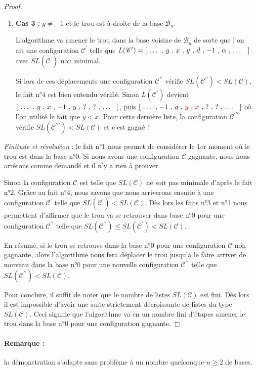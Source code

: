 \begin{proof}
\begin{enumerate}
        \item \textbf{Cas 3 :} $g \neq -1$ et le trou est à droite de la base $\mathcal{B}_y$.

        L'algorithme va amener le trou dans la base voisine de $\mathcal{B}_y$ de sorte que l'on ait une configuration $\mathscr{C}^\prime$ telle que $L(\mathscr{C}^\prime) = [ \text{\ \dots{} , $g$ , $x$ , $y$ , $d$ , $-1$ , $\alpha$ , \dots{} \ } ]$ avec $SL(\mathscr{C}^\prime)$ non minimal.

        Si lors de ces déplacements une configuration $\mathscr{C}^{\prime\prime}$ vérifie $SL(\mathscr{C}^{\prime\prime}) < SL(\mathscr{C})$, le fait n°4 est bien entendu vérifié.
        Sinon $L(\mathscr{C}^\prime)$ devient $[ \text{\ \dots{} , $g$ , $x$ , $-1$ , $y$ , $?$ , $?$ , \dots{} \ } ]$, puis $[ \text{\ \dots{} , $-1$ , $g$ , {\color{red} $y$ , $x$} , $?$ , $?$ , \dots{} \ } ]$ où l'on utilisé le fait que $y < x$. Pour cette dernière liste, la configuration $\mathscr{C}^{\prime\prime\prime}$ vérifie $SL(\mathscr{C}^{\prime\prime\prime}) < SL(\mathscr{C})$ et c'est gagné !
    \end{enumerate}


    \medskip

    \textit{Finitude et résolution} : le fait n°1 nous permet de considérer le 1er moment où le trou est dans la base n°0.
    Si nous avons une configuration $\mathscr{C}$ gagnante, nous nous arrêtons comme demandé et il n'y a rien à prouver.


    \medskip

    Sinon la configuration $\mathscr{C}$  est telle que $SL(\mathscr{C})$ ne soit pas minimale d'après le fait n°2.
    Grâce au fait n°4, nous savons que nous arriverons ensuite à une configuration $\mathscr{C}^\prime$ telle que $SL(\mathscr{C}^\prime) < SL(\mathscr{C})$.
    Dès lors les faits n°3 et n°1 nous permettent d'affirmer que le trou va se retrouver dans base n°0 pour une configuration $\mathscr{C}^{\prime\prime}$ telle que $SL(\mathscr{C}^{\prime\prime}) \leqslant SL(\mathscr{C}^\prime) < SL(\mathscr{C})$.


    \medskip

    En résumé, si le trou se retrouve dans la base n°0 pour une configuration $\mathscr{C}$ non gagnante, alors l'algorithme nous fera déplacer le trou jusqu'à le faire arriver de nouveau dans la base n°0 pour une nouvelle configuration $\mathscr{C}^{\prime\prime}$ telle que $SL(\mathscr{C}^{\prime\prime}) < SL(\mathscr{C})$.


    \medskip

    Pour conclure, il suffit de noter que le nombre de listes $SL(\mathscr{C})$ est fini.
    Dès lors il est impossible d'avoir une suite strictement décroissante de listes du type $SL(\mathscr{C})$.
    Ceci signifie que l'algorithme va en un nombre fini d'étapes amener le trou dans la base n°0 pour une configuration gagnante.
\end{proof}


\paragraph{Remarque :} \hspace{-1em} la démonstration s'adapte sans problème à un nombre quelconque $n \geqslant 2$ de bases.
